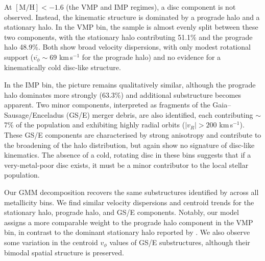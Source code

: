 \documentclass[a4paper,12pt]{article}
\begin{document}
At $\mathrm{[M/H]} < -1.6$ (the VMP and IMP regimes), a disc component is not observed. Instead, the kinematic structure 
is dominated by a prograde halo and a stationary halo. In the VMP bin, the sample is almost evenly split between these 
two components, with the stationary halo contributing 51.1\% and the prograde halo 48.9\%. Both show broad velocity 
dispersions, with only modest rotational support ($\overline{v_\phi} \sim 69$ km\,s$^{-1}$ for the prograde halo) 
and no evidence for a kinematically cold disc-like structure.

In the IMP bin, the picture remains qualitatively similar, although the prograde halo dominates more strongly 
(63.3\%) and additional substructure becomes apparent. Two minor components, interpreted as fragments of the 
Gaia–Sausage/Enceladus (GS/E) merger debris, are also identified, each contributing $\sim$7\% of the population 
and exhibiting highly radial orbits ($|v_R| > 200$ km\,s$^{-1}$). These GS/E components are characterised by 
strong anisotropy and contribute to the broadening of the halo distribution, but again show no signature of 
disc-like kinematics. The absence of a cold, rotating disc in these bins suggests that if a very-metal-poor 
disc exists, it must be a minor contributor to the local stellar population.

Our GMM decomposition recovers the same substructures identified by \citet{zhang2024existencemetalpoordiscmilky} 
across all metallicity bins. We find similar velocity dispersions and centroid trends for the stationary halo, 
prograde halo, and GS/E components. Notably, our model assigns a more comparable weight to the 
prograde halo component in the VMP bin, in contrast to the dominant stationary 
halo reported by \citet{zhang2024existencemetalpoordiscmilky}. We also observe some variation 
in the centroid $v_\phi$ values of GS/E substructures, although their bimodal spatial structure is preserved. 
\end{document}
